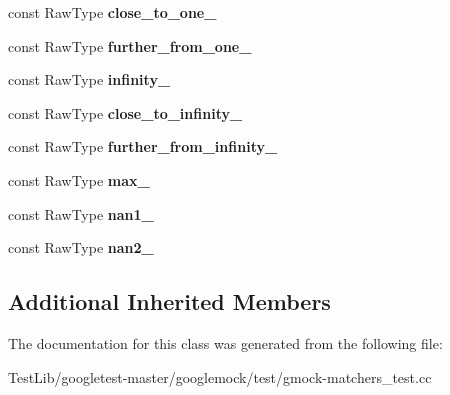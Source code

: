 \begin{DoxyCompactItemize}
const Raw\+Type {\bfseries close\+\_\+to\+\_\+one\+\_\+}
\item 
\mbox{\label{classtesting_1_1gmock__matchers__test_1_1FloatingPointTest_a049ba2d5d371e8aea6ada1ab5312b1bb}} 
const Raw\+Type {\bfseries further\+\_\+from\+\_\+one\+\_\+}
\item 
\mbox{\label{classtesting_1_1gmock__matchers__test_1_1FloatingPointTest_a21d8a019a6365ddff80e301a6163f43f}} 
const Raw\+Type {\bfseries infinity\+\_\+}
\item 
\mbox{\label{classtesting_1_1gmock__matchers__test_1_1FloatingPointTest_a6fc8ac2030f4883e1c84da3a21bbb7c3}} 
const Raw\+Type {\bfseries close\+\_\+to\+\_\+infinity\+\_\+}
\item 
\mbox{\label{classtesting_1_1gmock__matchers__test_1_1FloatingPointTest_a603ab51280ecb1c4147c2660a7a90728}} 
const Raw\+Type {\bfseries further\+\_\+from\+\_\+infinity\+\_\+}
\item 
\mbox{\label{classtesting_1_1gmock__matchers__test_1_1FloatingPointTest_a17b9dd56136b64fa7210bfe024d88c30}} 
const Raw\+Type {\bfseries max\+\_\+}
\item 
\mbox{\label{classtesting_1_1gmock__matchers__test_1_1FloatingPointTest_a0d2544956414eac21d4519fe600e4603}} 
const Raw\+Type {\bfseries nan1\+\_\+}
\item 
\mbox{\label{classtesting_1_1gmock__matchers__test_1_1FloatingPointTest_a4af3b3e53a06d271479ff30f5d5ee155}} 
const Raw\+Type {\bfseries nan2\+\_\+}
\end{DoxyCompactItemize}
\subsection*{Additional Inherited Members}


The documentation for this class was generated from the following file\+:\begin{DoxyCompactItemize}
\item 
Test\+Lib/googletest-\/master/googlemock/test/gmock-\/matchers\+\_\+test.\+cc\end{DoxyCompactItemize}
